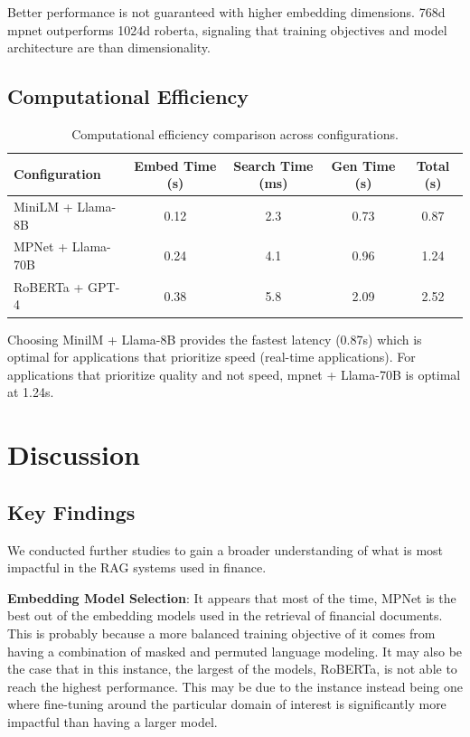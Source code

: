 \documentclass[runningheads]{llncs}
\begin{document}
Better performance is not guaranteed with higher embedding dimensions. 768d mpnet outperforms 1024d roberta, signaling that training objectives and model architecture are than dimensionality.




\subsection{Computational Efficiency}

\begin{table}[h]
\centering
\caption{Computational efficiency comparison across configurations.}
\label{tab:efficiency}
\begin{tabular}{lcccc}
\toprule
\textbf{Configuration} & \textbf{Embed Time (s)} & \textbf{Search Time (ms)} & \textbf{Gen Time (s)} & \textbf{Total (s)} \\
\midrule
MiniLM + Llama-8B & 0.12 & 2.3 & 0.73 & 0.87 \\
MPNet + Llama-70B & 0.24 & 4.1 & 0.96 & 1.24 \\
RoBERTa + GPT-4 & 0.38 & 5.8 & 2.09 & 2.52 \\
\bottomrule
\end{tabular}
\end{table}

Choosing MinilM + Llama-8B provides the fastest latency (0.87s) which is optimal for applications that prioritize speed (real-time applications). For applications that prioritize quality and not speed, mpnet + Llama-70B is optimal at 1.24s.


\section{Discussion}

\subsection{Key Findings}

We conducted further studies to gain a broader understanding of what is most impactful in the RAG systems used in finance.

\textbf{Embedding Model Selection}: It appears that most of the time, MPNet is the best out of the embedding models used in the retrieval of financial documents. This is probably because a more balanced training objective of it comes from having a combination of masked and permuted language modeling. It may also be the case that in this instance, the largest of the models, RoBERTa, is not able to reach the highest performance. This may be due to the instance instead being one where fine-tuning around the particular domain of interest is significantly more impactful than having a larger model.
\end{document}
